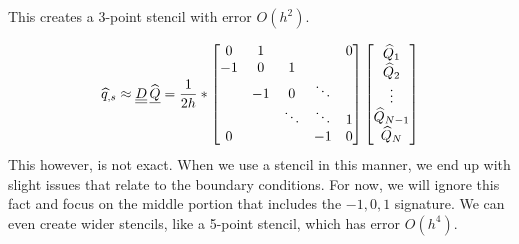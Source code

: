 This creates a 3-point stencil with error $O(h^2)$. 

\begin{align*}
\widehat{q}_{,s} \approx {\underline{\underline{D}}}\,\widehat{{\underline{Q}}} = \frac{1}{2h}* \begin{bmatrix} 0&1&  &  &0 \\ -1&0&1  &  & \\   &-1&0&\ddots  &  \\   &  &\ddots&\ddots&1 \\ 0&  &  &-1&0 \end{bmatrix} \begin{bmatrix} \widehat{Q}_1 \\ \widehat{Q}_2 \\ \vdots \\ \widehat{Q}_{N-1} \\ \widehat{Q}_N \end{bmatrix}
\end{align*}
This however, is not exact. When we use a stencil in this manner, we end up with slight issues that relate to the boundary conditions. For now, we will ignore this fact and focus on the middle portion that includes the $-1, 0, 1$ signature. We can even create wider stencils, like a 5-point stencil, which has error $O(h^4)$.

